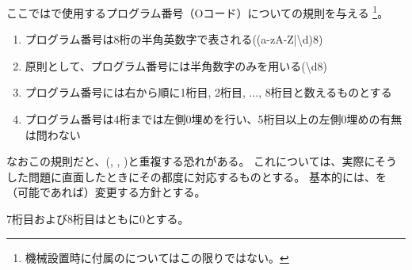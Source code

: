 

ここでは\DMC で使用するプログラム番号（Oコード）についての規則を与える
\footnote{機械設置時に付属の\BundledNCPrg についてはこの限りではない。}。



\begin{enumerate}[label=\Roman*., ref=\Roman*]
\item {}プログラム番号は8桁の半角英数字で表される({\ttfamily(a-zA-Z|\textbackslash d){8}})
\item 原則として、プログラム番号には半角数字のみを用いる({\ttfamily\textbackslash d{8}})
\item {}プログラム番号には右から順に1桁目, 2桁目, ..., 8桁目と数えるものとする
\item\label{item:PNbasicGE4}プログラム番号は4桁までは左側0埋めを行い、5桁目以上の左側0埋めの有無は問わない
\end{enumerate}
\begin{hosoku}
なおこの規則だと、\BundledNCPrg(, , )と重複する恐れがある。
これについては、実際にそうした問題に直面したときにその都度に対応するものとする。
基本的には、\BundledNCPrg を（可能であれば）変更する方針とする。
\end{hosoku}


7桁目および8桁目はともに0とする。

